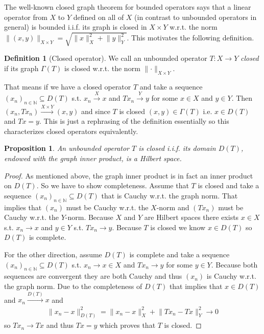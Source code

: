 \documentclass[12pt,a4paper]{article}
\numberwithin{equation}{subsection}
\numberwithin{lemma}{subsection}
\newtheorem{proposition}[lemma]{Proposition}
\theoremstyle{definition}
\newtheorem{definition}[lemma]{Definition}
\newcommand{\naturalnum}{\mathbb{N}}
\begin{document}
The well-known closed graph theorem for bounded operators says that 
a linear operator from $X$ to $Y$ defined on all of $X$ 
(in contrast to unbounded operators in general) is bounded i.i.f. 
its graph is closed in $X\times Y$ w.r.t. the norm 
$\lVert (x,y) \rVert _{X\times Y} 
= \sqrt{\lVert x \rVert^2 _{X} + \lVert y \rVert^2 _{Y}}$. 
This motivates the following definition.

\begin{definition}[Closed operator]
    We call an unbounded operator $T:X \rightarrow Y$ \textit{closed} if 
    its graph $\Gamma(T)$ is closed w.r.t. the norm 
    $\lVert \cdot \rVert _{X\times Y}$.
\end{definition}
That means if we have a closed operator $T$ and
take a sequence $(x_n)_{n\in \naturalnum} \subseteq D(T)$
s.t. $x_n \xrightarrow{X} x$ and $Tx_n \xrightarrow{Y} y$ for some 
$x \in X$ and $y \in Y$. Then $(x_n,Tx_n) \xrightarrow{X\times Y} (x,y)$ and 
since $T$ is closed
$(x,y) \in \Gamma(T)$ i.e. $x \in D(T)$ and $Tx = y$. This is just 
a rephrasing of the definition essentially so this characterizes closed
operators equivalently.

\begin{proposition}\label{prop:closed_operator_graph_norm}
    An unbounded operator $T$ is closed i.i.f. its domain $D(T)$, endowed with the 
    graph inner product, is a Hilbert space.
\end{proposition}
\begin{proof}
    As mentioned above, the graph inner product is in fact an inner product 
    on $D(T)$. So we have to show completeness.
    Assume that $T$ is closed and take a sequence $(x_n)_{n \in \naturalnum} 
    \subseteq D(T)$ that is Cauchy w.r.t. the graph norm. That implies 
    that $(x_n)$ must be Cauchy w.r.t. the $X$-norm and $(Tx_n)$ must be 
    Cauchy w.r.t. the $Y$-norm. Because $X$ and $Y$ are Hilbert spaces 
    there exists $x \in X$ s.t. $x_n \rightarrow x$ and $y \in Y$ s.t. 
    $Tx_n \rightarrow y$. Because $T$ is closed we know 
    $x \in D(T)$ so $D(T)$ is complete.

    For the other direction, assume $D(T)$ is complete and take a sequence 
    $(x_n)_{n \in \naturalnum} \subseteq D(T)$ s.t. $x_n \rightarrow x \in X$ 
    and $Tx_n \rightarrow y$ for some $y \in Y$. Because both sequences are 
    convergent they are both Cauchy and thus $(x_n)$ is Cauchy w.r.t. the
    graph norm. Due to the completeness of $D(T)$ that implies that $x \in D(T)$
    and $x_n \xrightarrow{D(T)} x$ and 
    \begin{align*}
        \lVert x_n - x \rVert^2 _{D(T)} 
        = \lVert x_n - x \rVert^2 _X + \lVert Tx_n - Tx \rVert^2 _Y 
        \rightarrow 0
    \end{align*}
    so $T x_n \rightarrow T x$ and thus $Tx = y$ which proves that 
    $T$ is closed.
\end{proof}
\end{document}
